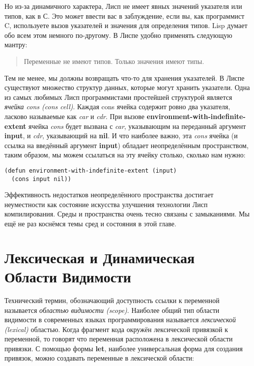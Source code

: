 Но из-за динамичного характера, Лисп не имеет явных значений указателя или типов, как в С. Это может ввести вас в заблуждение, если вы, как программист C, используете вызов указателей и значения для определения типов. Lisp думает обо всем этом немного по-другому. В Лиспе удобно применять следующую мантру:

\begin{quote}
Переменные не имеют типов. Только значения имеют типы.
\end{quote}

Тем не менее, мы должны возвращать что-то для хранения указателей. В Лиспе существуют множество структур данных, которые могут хранить указатели. Одна из самых любимых Лисп программистами простейшей структурой является \emph{ячейка cons (cons cell)}. Каждая cons ячейка содержит ровно два указателя, ласково называемые как \emph{car} и \emph{cdr}. При вызове \textbf{environment-with-indefinite-extent} ячейка \emph{cons} будет вызвана с \emph{car}, указывающим на переданный аргумент \textbf{input}, и \emph{cdr}, указывающий на \textbf{nil}. И что наиболее важно, эта \emph{cons} ячейка (и ссылка на введённый аргумент \textbf{input}) обладает неопределённым пространством, таким образом, мы можем ссылаться на эту ячейку столько, сколько нам нужно:

\begin{verbatim}
(defun environment-with-indefinite-extent (input)
  (cons input nil))
\end{verbatim}

Эффективность недостатков неопределённого пространства достигает неуместности как состояние искусства улучшения технологии Лисп компилирования. Среды и пространства очень тесно связаны с замыканиями. Мы ещё не раз коснёмся темы сред и состояния в этой главе.

\section[Области Видимости]{Лексическая и Динамическая\\ Области Видимости}\label{section_lexical_and_dynamic_scope}

Технический термин, обозначающий доступность ссылки к переменной называется \emph{областью видимости (scope)}. Наиболее общий тип области видимости в современных языках программирования называется \emph{лексической (lexical)} областью. Когда фрагмент кода окружён лексической привязкой к переменной, то говорят что переменная расположена в лексической области привязки. С помощью формы \textbf{let}, наиболее универсальная форма для создания привязок, можно создавать переменные в лексической области:


